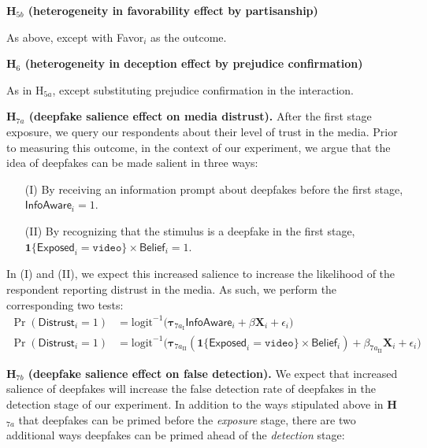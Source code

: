 \documentclass[12pt,letterpaper]{article}
\begin{document}
\noindent \textbf{H$_{5b}$ (heterogeneity in favorability effect by partisanship)}

As above, except with \textsf{Favor}$_i$ as the outcome.

\noindent \textbf{H$_{6}$ (heterogeneity in deception effect by prejudice confirmation)}

As in H$_{5a}$, except substituting prejudice confirmation in the interaction.


\noindent \textbf{H$_{7a}$ (deepfake salience effect on media distrust).} After the first stage exposure, we query our respondents about their level of trust in the media. Prior to measuring this outcome, in the context of our experiment, we argue that the idea of deepfakes can be made salient in three ways:
\begin{enumerate}
    \item[(I)] By receiving an information prompt about deepfakes before the first stage,  $\textsf{InfoAware}_i = 1$.
    \item[(II)] By recognizing that the stimulus is a deepfake in the first stage,  $\mathbf{1}\{\textsf{Exposed}_i = \texttt{video} \} \times \textsf{Belief}_i = 1$.
\end{enumerate}
In (I) and (II), we expect this increased salience to increase the likelihood of the respondent reporting distrust in the media. As such, we perform the corresponding two tests:
\begin{align}
    \Pr(\textsf{Distrust}_i = 1) & = \text{logit}^{-1}\Big(\bm{\tau}_{7a_{\text{I}}} \textsf{InfoAware}_i 
    + \beta \mathbf{X}_i + \epsilon_i\Big) \\
    \Pr(\textsf{Distrust}_i = 1) & = \text{logit}^{-1}\Big(\bm{\tau}_{7a_{\text{II}}} (\mathbf{1}\{\textsf{Exposed}_i = \texttt{video} \} \times \textsf{Belief}_i)
    + \beta_{7a_{\text{II}}}\mathbf{X}_i + \epsilon_i\Big)
\end{align}

\noindent \textbf{H$_{7b}$ (deepfake salience effect on false detection).} We expect that increased salience of deepfakes will increase the false detection rate of deepfakes in the detection stage of our experiment. In addition to the ways stipulated above in \textbf{H$_{7a}$} that deepfakes can be primed before the \textit{exposure} stage, there are two additional ways deepfakes can be primed ahead of the \textit{detection} stage:
\end{document}
